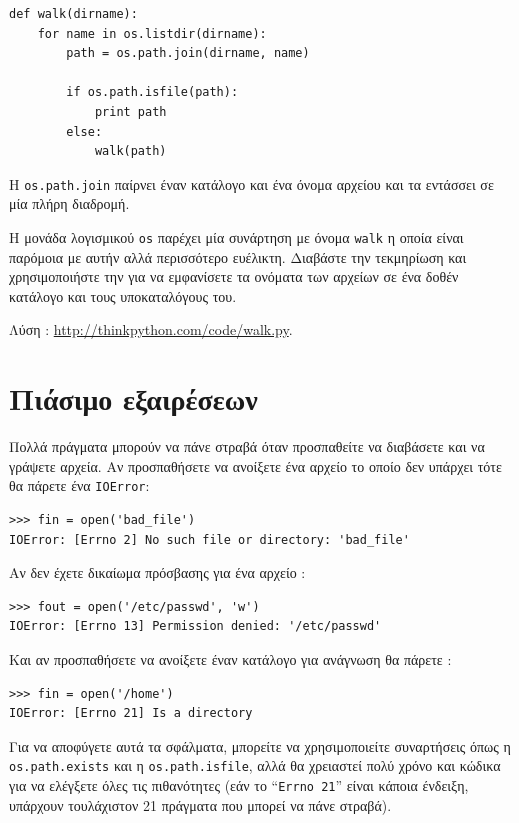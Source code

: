 \documentclass[10pt]{book}
\begin{document}
\begin{verbatim}
def walk(dirname):
    for name in os.listdir(dirname):
        path = os.path.join(dirname, name)

        if os.path.isfile(path):
            print path
        else:
            walk(path)
\end{verbatim}
%
 Η  {\tt os.path.join}  παίρνει έναν κατάλογο και ένα όνομα αρχείου και τα εντάσσει σε μία πλήρη διαδρομή.

\begin{exercise}

Η μονάδα λογισμικού  {\tt os}  παρέχει μία συνάρτηση με όνομα  {\tt walk}  η οποία είναι παρόμοια με αυτήν αλλά περισσότερο ευέλικτη. Διαβάστε την τεκμηρίωση και χρησιμοποιήστε την για να εμφανίσετε τα ονόματα των αρχείων σε ένα δοθέν κατάλογο 
και τους υποκαταλόγους του.

Λύση : \url{http://thinkpython.com/code/walk.py}. 
\end{exercise}


\section{Πιάσιμο εξαιρέσεων}
\label{catch}

Πολλά πράγματα μπορούν να πάνε στραβά όταν προσπαθείτε να διαβάσετε και να γράψετε αρχεία. 
Αν προσπαθήσετε να ανοίξετε ένα αρχείο το οποίο δεν υπάρχει τότε θα πάρετε ένα  {\tt IOError}:

\begin{verbatim}
>>> fin = open('bad_file')
IOError: [Errno 2] No such file or directory: 'bad_file'
\end{verbatim}
%
 Αν δεν έχετε δικαίωμα πρόσβασης για ένα αρχείο :

\begin{verbatim}
>>> fout = open('/etc/passwd', 'w')
IOError: [Errno 13] Permission denied: '/etc/passwd'
\end{verbatim}
%
 Και αν προσπαθήσετε να ανοίξετε έναν κατάλογο για ανάγνωση θα πάρετε :

\begin{verbatim}
>>> fin = open('/home')
IOError: [Errno 21] Is a directory
\end{verbatim}
%
Για να αποφύγετε αυτά τα σφάλματα, μπορείτε να χρησιμοποιείτε συναρτήσεις όπως η  {\tt os.path.exists}  και η  {\tt os.path.isfile},  αλλά θα χρειαστεί πολύ χρόνο και κώδικα για να ελέγξετε όλες τις πιθανότητες (εάν το  ``{\tt Errno 21}''  είναι κάποια ένδειξη, υπάρχουν τουλάχιστον 21 πράγματα που μπορεί να πάνε στραβά).
\end{document}
